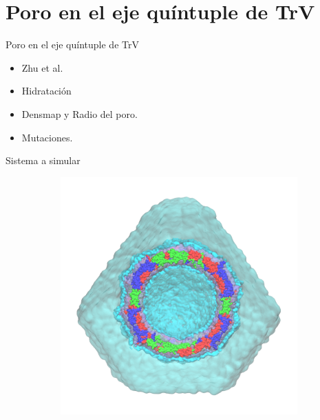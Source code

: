 \documentclass[8pt]{beamer}
\begin{document}
\section{Poro en el eje quíntuple de TrV}
\begin{frame}[t]{Poro en el eje quíntuple de TrV}
\begin{itemize}
  \item Zhu et al.
  \item Hidratación
  \item Densmap y Radio del poro.
  \item Mutaciones.
\end{itemize}
\end{frame}

\begin{frame}[t]{Sistema a simular}

\begin{figure}[ht]
\vspace{-0.4cm}
\centering
\hspace*{\fill}
\begin{subfigure}[t]{.46\textwidth}
  \centering
  \includegraphics[width=1\textwidth]{Figure/TrV_Capsid_WaterBox.png}
  \caption{}
  \label{fig:trv_capsid_waterbox}
\end{subfigure}
\hspace*{\fill}
\begin{subfigure}[t]{.46\textwidth}

\end{subfigure}
\end{figure}
\end{frame}
\end{document}
